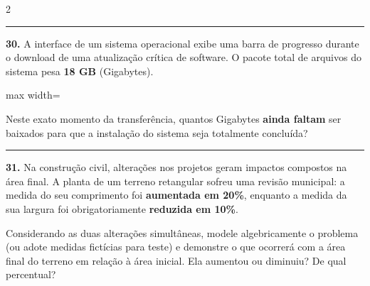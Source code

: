 \documentclass[twoside, 10pt, a4paper]{article}
\newlength{\espacoPreQuestao}
\newlength{\espacoQuestao}
\begin{document}
\begin{multicols*}{2}
\noindent\textcolor{CorLinha}{\rule{\linewidth}{0.5pt}} 
\par\vspace{\espacoPreQuestao}
\textbf{30.} A interface de um sistema operacional exibe uma barra de progresso durante o download de uma atualização crítica de software. O pacote total de arquivos do sistema pesa \textbf{18 GB} (Gigabytes).

\begin{center}
\begin{adjustbox}{max width=\linewidth}
\end{adjustbox}
\end{center}

Neste exato momento da transferência, quantos Gigabytes \textbf{ainda faltam} ser baixados para que a instalação do sistema seja totalmente concluída?
\par\vspace{\espacoQuestao}

\noindent\textcolor{CorLinha}{\rule{\linewidth}{0.5pt}} 
\par\vspace{\espacoPreQuestao}
\textbf{31.} Na construção civil, alterações nos projetos geram impactos compostos na área final. A planta de um terreno retangular sofreu uma revisão municipal: a medida do seu comprimento foi \textbf{aumentada em 20\%}, enquanto a medida da sua largura foi obrigatoriamente \textbf{reduzida em 10\%}. 

Considerando as duas alterações simultâneas, modele algebricamente o problema (ou adote medidas fictícias para teste) e demonstre o que ocorrerá com a área final do terreno em relação à área inicial. Ela aumentou ou diminuiu? De qual percentual?
\par\vspace{\espacoQuestao}


\end{multicols*}
\end{document}
